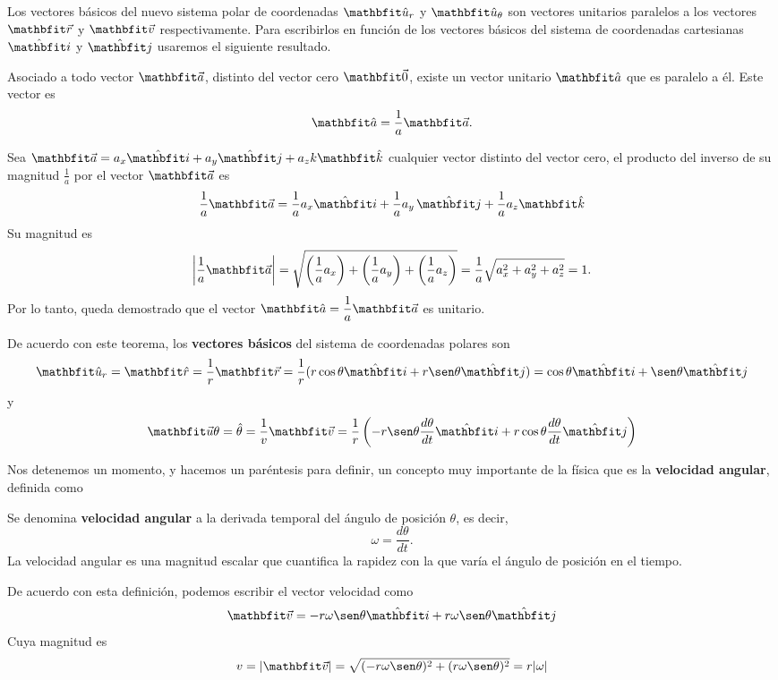 Los vectores básicos del nuevo sistema polar de coordenadas $\uniu_r$ y $\uniu_\theta$ son vectores unitarios paralelos a los vectores $\vecr$ y $\veloi$ respectivamente. Para escribirlos en función de los vectores básicos del sistema de coordenadas cartesianas $\veci$ y $\vecj$ usaremos el siguiente resultado.
\begin{theorem}{}{}
    Asociado a todo vector $\veca$, distinto del vector cero $\vecce$, existe un vector unitario $\auni$ que es paralelo a él. Este vector es
    $$\auni = \frac{1}{a}\veca.$$
    \begin{demo}
        Sea $\veca = a_x\veci + a_y\vecj + a_zk\veck$ cualquier vector distinto del vector cero, el producto del inverso de su magnitud $\frac{1}{a}$ por el vector $\veca$ es
        $$\frac{1}{a}\veca = \frac{1}{a}a_x\veci + \frac{1}{a}a_y\,\vecj + \frac{1}{a}a_z\veck$$
        Su magnitud es
        $$\left|\frac{1}{a}\veca\right| = \sqrt{\left(\frac{1}{a}a_x\right) + \left(\frac{1}{a}a_y\right) + \left(\frac{1}{a}a_z\right)} = \frac{1}{a}\sqrt{a_x^2 + a_y^2 + a_z^2} = 1.$$
        Por lo tanto, queda demostrado que el vector $\auni = \dfrac{1}{a}\veca$ es unitario.
    \end{demo}
\end{theorem}

De acuerdo con este teorema, los \textbf{vectores básicos} del sistema de coordenadas polares son
$$\uniu_r =  \runi = \frac{1}{r}\vecr = \frac{1}{r}(r\cos\theta\veci + r\sen\theta\vecj) = \cos\theta\veci + \sen\theta\vecj$$
y
$$\velou\theta = \thetau = \frac{1}{v}\veloi = \frac{1}{r}\left(-r\sen\theta\frac{d\theta}{dt}\veci + r\cos\theta\frac{d\theta}{dt}\vecj\right)$$

Nos detenemos un momento, y hacemos un paréntesis para definir, un concepto muy importante de
la física que es la \textbf{velocidad angular}, definida como
\begin{definition}{}{}
    Se denomina \textbf{velocidad angular} a la derivada temporal del ángulo de posición $\theta$, es decir,
    \begin{equation*}
        \omega = \frac{d\theta}{dt}.
    \end{equation*}
    La velocidad angular es una magnitud escalar que cuantifica la rapidez con la que varía el ángulo de posición en el tiempo.
\end{definition}

De acuerdo con esta definición, podemos escribir el vector velocidad como
$$\veloi = -r\omega\sen\theta\veci + r\omega\sen\theta\vecj$$
Cuya magnitud es
$$v = |\veloi| = \sqrt{(-r\omega\sen\theta)^2 + (r\omega\sen\theta)^2} = r|\omega|$$

